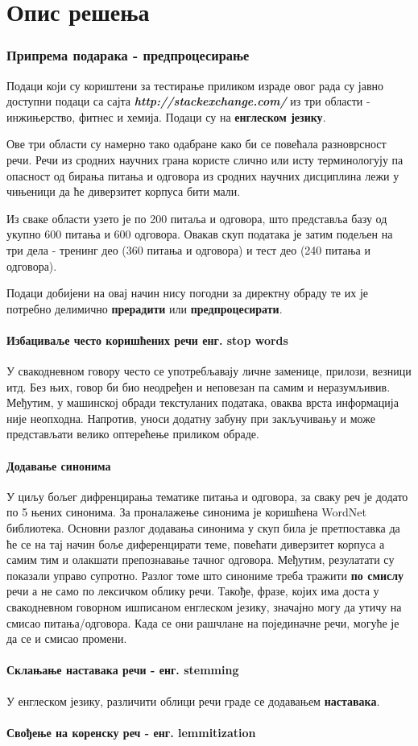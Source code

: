 \chapter{Опис решења}
\subsection{Припрема подарака - предпроцесирање}

Подаци који су кориштени за тестирање приликом израде овог рада су јавно доступни подаци са сајта \textbf{\textit{http://stackexchange.com/}} из три области  - инжињерство, фитнес и хемија. Подаци су на \textbf{енглеском језику}.

Ове три области су намерно тако одабране како би се повећала разноврсност речи. Речи из сродних научних грана користе слично или исту терминологују па опасност од бирања питања и одговора из  сродних научних дисциплина лежи у чињеници да ће диверзитет корпуса бити мали.

Из сваке области узето је по 200 питаља и одговора, што представља базу од укупно 600 питања и 600 одговора. Овакав скуп података је затим подељен на три дела - тренинг део (360 питања и одговора) и тест део (240 питања и одговора).

Подаци добијени на овај начин нису погодни за директну обраду те их је потребно делимично \textbf{прерадити} или \textbf{предпроцесирати}. 

	\subsubsection{Избациваље често коришћених речи енг. stop words}
		
У свакодневном говору често се употребљавају личне заменице, прилози, везници итд. Без њих, говор би био неодређен и неповезан па самим и неразумљивив. Међутим, у машинској обради текстуланих података, оваква врста информација није неопходна. Напротив, уноси додатну забуну при закључивању и може представљати велико оптерећење приликом обраде.	
	
	
	\subsubsection{Додавање синонима}
У циљу бољег дифренцирања тематике питања и одговора, за сваку реч је додато по 5 њених синонима. За проналажење синонима је коришћена WordNet библиотека. Основни разлог додавања синонима у скуп била је претпоставка да ће се на тај начин боље диференцирати теме, повећати диверзитет корпуса а самим тим и олакшати препознавање тачног одговора. Међутим, резулатати су показали управо супротно. Разлог томе што синониме треба тражити \textbf{по смислу} речи а не само по лексичком облику речи. Такође, фразе, којих има доста у свакодневном говорном ишписаном енглеском језику, значајно могу да утичу на смисао питања/одговора. Када се они рашчлане на појединачне речи, могуће је да се и смисао промени.
	\subsubsection{Склањање наставака речи - енг. stemming}
	
У енглеском језику, различити облици речи граде се додавањем \textbf{наставака}. 

	
	\subsubsection{Свођење на коренску реч - енг. lemmitization}

